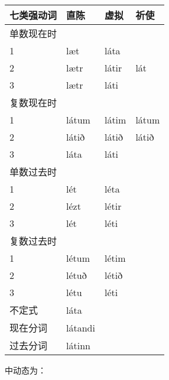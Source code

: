 \begin{longtable}{llll}
  \toprule
  七类强动词 & 直陈    & 虚拟  & 祈使  \\
  \midrule
  \endhead
  \bottomrule
  \endfoot
  单数现在时 &         &       &       \\
  1          & læt     & láta  &       \\
  2          & lætr    & látir & lát   \\
  3          & lætr    & láti  &       \\
  复数现在时 &         &       &       \\
  1          & látum   & látim & látum \\
  2          & látið   & látið & látið \\
  3          & láta    & láti  &       \\
  单数过去时 &         &       &       \\
  1          & lét     & léta  &       \\
  2          & lézt    & létir &       \\
  3          & lét     & léti  &       \\
  复数过去时 &         &       &       \\
  1          & létum   & létim &       \\
  2          & létuð   & létið &       \\
  3          & létu    & léti  &       \\
  不定式     & láta    &       &       \\
  现在分词   & látandi &       &       \\
  过去分词   & látinn  &       &       \\
\end{longtable}

中动态为：

